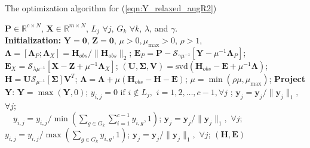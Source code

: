 \documentclass[10pt,journal,compsoc]{IEEEtran}
\begin{document}
 \begin{algorithm}[htp!]
  \caption{The optimization algorithm for (\ref{eqn:Y_relaxed_augR2})}
  \begin{algorithmic}[1]
    \Require
      $\mathbf{P} \in \mathbb{R}^{c \times N}$, $\mathbf{X} \in \mathbb{R}^{m \times N}$, $L_j \,\, \forall j$, $G_k \,\, \forall k$,  $\lambda$, and $\gamma$.\\
    \textbf{Initialization:} $\mathbf{Y}=\mathbf{0}$, $\mathbf{Z} = \mathbf{0}$, $\mu > 0, \mu_{\max} > 0$,  $\rho > 1$, $\mathbf{\Lambda} = [\mathbf{\Lambda}_P; \mathbf{\Lambda}_X] = \mathbf{H}_{obs} / \|\mathbf{H}_{obs}\|_2$;
      \State $\mathbf{E}_P = \mathbf{P} - \mathcal{S}_{\gamma \mu^{-1}}[ \mathbf{Y} - \mu^{-1} \mathbf{\Lambda}_P]$;
      \State $\mathbf{E}_X = \mathcal{S}_{\lambda \mu^{-1}}[ \mathbf{X} - \mathbf{Z} + \mu^{-1} \mathbf{\Lambda}_X]$;
      \State $(\mathbf{U}, \mathbf{\Sigma}, \mathbf{V}) = \mathrm{svd}\left(\mathbf{H}_{obs} - \mathbf{E} + \mu^{-1} \mathbf{\Lambda}\right)$;
      \State $\mathbf{H} = \mathbf{U} \mathcal{S}_{\mu^{-1}}[\mathbf{\Sigma}] \mathbf{V}^T $;
      \State $\mathbf{\Lambda} = \mathbf{\Lambda} + \mu \left(\mathbf{H}_{obs} - \mathbf{H} - \mathbf{E} \right)$;
      \State $\mu = \min(\rho \mu , \mu_{\max} )$;
      \State \textbf{Project }$\mathbf{Y}$:
      \State $\mathbf{Y} = \max(\mathbf{Y}, 0)$; \label{line:p2_1}  %
      \State $y_{i,j} = 0 \,\, \mathrm{if}  \,\, i \notin L_j,\,\, i = 1, 2, \dots, c-1,\forall j$ \label{line:p2_2};
      \State $\mathbf{y}_j = \mathbf{y}_j / \|\mathbf{y}_j\|_1,$ $\forall j$;%
\\   \quad\quad\quad\quad\quad\,\,\,\,   $ y_{i,j} =  y_{i,j} / \min( \sum_{g \in G_k}  \sum_{i=1}^{c-1} y_{i,g} , 1 )$;
      \EndFor
      \EndIf
      \EndFor
      \State $\mathbf{y}_j = \mathbf{y}_j / \|\mathbf{y}_j\|_1,$ $\forall j$;%
      \State $ y_{i,j} =  y_{i,j} / \max( \sum_{g \in G_k} y_{i,g}, 1 )$;
      \EndFor
      \EndFor
      \State $\mathbf{y}_j = \mathbf{y}_j / \|\mathbf{y}_j\|_1,$ $\forall j$;%
    \EndWhile
    \Ensure
        $(\mathbf{H}, \mathbf{E})$
  \end{algorithmic}\label{alg:alm2}
\end{algorithm}
\end{document}
